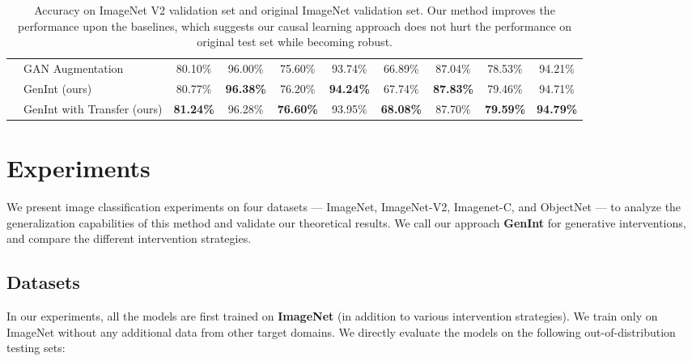 \documentclass[final]{cvpr}
\begin{document}
\begin{table*}[t]
\begin{tabular}{ll|cc|cc|cc||cc}
           & GAN Augmentation \cite{CAS}  & 80.10\% & 96.00\% & 75.60\% & 93.74\% & 66.89\% & 87.04\% & 78.53\% & 94.21\% \\
           \cmidrule{2-10}
           & GenInt (ours) & 80.77\% & \textbf{96.38\%} & 76.20\% & \textbf{94.24\%} & 67.74\% & \textbf{87.83\%} & 79.46\% & 94.71\% \\


           & GenInt with Transfer (ours) & 
            \textbf{81.24\%} & 96.28\% & \textbf{76.60\%} & 93.95\% & \textbf{68.08\%} & 87.70\%& \textbf{79.59\%} & \textbf{94.79\%} \\
           
\bottomrule
    \end{tabular}
\vspace{3px}
\caption{Accuracy on ImageNet V2 validation set \cite{ImageNetOverfit} and original ImageNet validation set. Our method improves the performance upon the baselines, which suggests our causal learning approach does not hurt the performance on original test set while becoming robust.}
\vspace{-5mm}
\label{tab:imagenet-v2-18}
\end{table*}





\section{Experiments}



We present image classification experiments on four datasets --- ImageNet, ImageNet-V2, Imagenet-C, and ObjectNet --- to analyze the generalization capabilities of this method and validate our theoretical results. We call our approach \textbf{GenInt} for generative interventions, and compare the different intervention strategies. 





\subsection{Datasets}

In our experiments, all the models are first trained on \textbf{ImageNet} \cite{imagenet_cvpr09}  (in addition to various intervention strategies). We train only on ImageNet without any additional data from other target domains. We directly evaluate the models on the following out-of-distribution testing sets:
\end{document}
